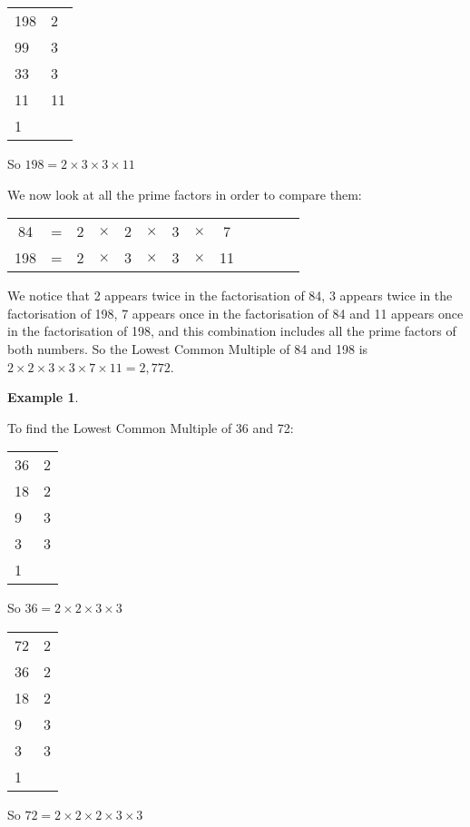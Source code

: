 \documentclass[11pt, oneside]{article}
\theoremstyle{definition}
\newtheorem{exmp}{Example}[section]
\begin{document}
\bigbreak

\begin{tabular}{ p{0.5cm} | p{1.5cm}}
198 & 2  \\
99 & 3  \\
33 & 3  \\
11 & 11 \\
1 
\end{tabular}

So $198 = 2\times 3 \times 3 \times 11$

We now look at all the prime factors in order to compare them:

\begin{tabular}{c c c c c c c c c c c c c}
84 & = & 2 & $\times$ & 2 & $\times$ & 3 & $\times$ & 7 &  &  &  &  \\
198 & = & 2 & $\times$ & 3 & $\times$ & 3 & $\times $ & 11 &  &  &  & 
\end{tabular}

We notice that 2 appears twice in the factorisation of 84, 3 appears twice in the factorisation of 198, 7 appears once in the factorisation of 84 and 11 appears once in the factorisation of 198, and this combination includes all the prime factors of both numbers. So the Lowest Common Multiple of 84 and 198 is $2\times 2 \times 3 \times 3 \times 7 \times 11 = 2,772$.

\begin{exmp} \end{exmp}
To find the Lowest Common Multiple of 36 and 72:

\begin{tabular}{ p{0.5cm} | p{1.5cm}}
36 & 2  \\
18 & 2  \\
9 & 3  \\
3 & 3  \\
1 &  
\end{tabular}

So $36 = 2 \times 2 \times 3 \times 3$

\bigbreak

\begin{tabular}{ p{0.5cm} | p{1.5cm}}
72 & 2  \\
36 & 2  \\
18 & 2  \\
9 & 3  \\
3 & 3  \\
1 &  
\end{tabular}

So $72 = 2\times 2 \times 2 \times 3 \times 3$
\end{document}

